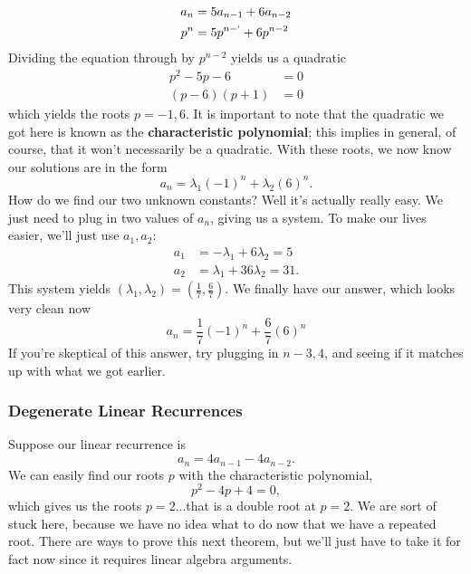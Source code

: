 \begin{align*}
    a_n &= 5a_{n-1}+6a_{n-2} \\
    p^n &= 5p^{n-`}+6p^{n-2} 
\end{align*}
Dividing the equation through by $p^{n-2}$ yields us a quadratic
\begin{align*}
    p^2-5p-6 &= 0 \\
    (p-6)(p+1) &= 0 
\end{align*}
which yields the roots $p=-1, 6$. It is important to note that the quadratic we got here is known as the \textbf{characteristic polynomial}; this implies in general, of course, that it won't necessarily be a quadratic. With these roots, we now know our solutions are in the form
\begin{equation}
    a_n = \lambda_1 (-1)^n + \lambda_2 (6)^n.
\end{equation}
How do we find our two unknown constants? Well it's actually really easy. We just need to plug in two values of $a_n$, giving us a system. To make our lives easier, we'll just use $a_1, a_2$:
\begin{align*}
    a_1 &= -\lambda_1+6\lambda_2 = 5\\
    a_2 &= \lambda_1+36\lambda_2 = 31.
\end{align*}
This system yields $(\lambda_1, \lambda_2) = (\frac{1}{7},\frac{6}{7})$. We finally have our answer, which looks very clean now
\begin{equation}
    \boxed{a_n = \frac{1}{7}(-1)^n+\frac{6}{7}(6)^n}
\end{equation}
If you're skeptical of this answer, try plugging in $n-3, 4$, and seeing if it matches up with what we got earlier.

\subsubsection{Degenerate Linear Recurrences}
Suppose our linear recurrence is 
\begin{equation}
    a_n = 4a_{n-1}-4a_{n-2}.
\end{equation}
We can easily find our roots $p$ with the characteristic polynomial,
\begin{equation}
    p^2-4p+4 = 0,
\end{equation}
which gives us the roots $p=2$...that is a double root at $p=2$. We are sort of stuck here, because we have no idea what to do now that we have a repeated root. There are ways to prove this next theorem, but we'll just have to take it for fact now since it requires linear algebra arguments.

